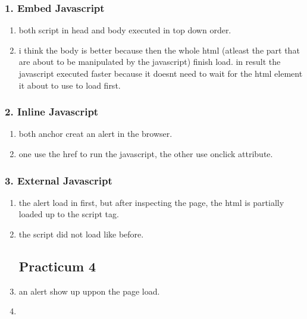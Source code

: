 \documentclass[12pt,titlepage]{article}
\begin{document}
\subsubsection*{1. Embed Javascript}
\begin{enumerate}
    \item both script in head and body executed in top down order. 
    \item i think the body is better because then the whole html (atleast the part that are about to be manipulated by the javascript) finish load. in result the javascript executed faster because it doesnt need to wait for the html element it about to use to load first. 
\end{enumerate}

\subsubsection*{2. Inline Javascript}
\begin{enumerate}
    \item both anchor creat an alert in the browser. 
    \item one use the href to run the javascript, the other use onclick attribute. 
\end{enumerate}

\subsubsection*{3. External Javascript}
\begin{enumerate}
    \item the alert load in first, but after inspecting the page, the html is partially loaded up to the script tag.
    \item the script did not load like before.
    \subsection*{Practicum 4}
    \item an alert show up uppon the page load.
    \item 
\end{enumerate}
\end{document}
